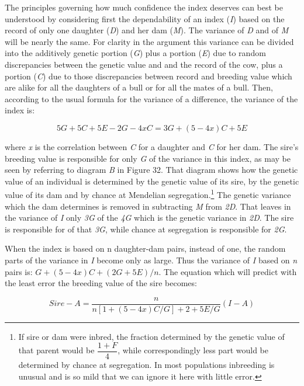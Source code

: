 The principles governing how much confidence the index deserves
can best be understood by considering first the dependability of an
index (\textit{I}) based on the record of only one daughter (\textit{D})
and her dam (\textit{M}). The variance of \textit{D} and of \textit{M}
will be nearly the same. For clarity in the argument this variance can
be divided into the additively genetic portion (\textit{G}) plus a portion
(\textit{E}) due to random discrepancies between the genetic value and and
the record of the cow, plus a portion (\textit{C}) due to those
discrepancies between record and breeding value which are alike for all
the daughters of a bull or for all the mates of a
\newpage
\noindent
bull. Then, according to the usual formula for the variance of a difference,
the variance of the index is:

\[ 5G + 5C + 5E - 2G - 4xC = 3G + (5 - 4x)C + 5E \]

\noindent
where \textit{x} is the correlation between \textit{C} for a daughter and
\textit{C} for her dam. The sire's breeding value is responsible for only
\textit{G} of the variance in this index, as may be seen by referring to
diagram \textit{B} in Figure 32. That diagram shows how the genetic value
of an individual is  determined by the genetic value of its
sire,  by the genetic value of its dam and 
by chance at Mendelian segregation.\footnote{If sire or dam were inbred,
the fraction determined by the genetic value of that parent would be
$\dfrac{1+F}{4}$, while correspondingly less part would be determined by
chance at segregation. In most populations inbreeding is unusual and is so
mild that we can ignore it here with little error.} The genetic variance
which the dam determines is removed in subtracting \textit{M} from
\textit{2D}. That leaves in the variance of \textit{I} only \textit{3G}
of the \textit{4G} which is the genetic variance in \textit{2D}. The sire
is responsible for  of that \textit{3G}, while chance at
segregation is responsible for \textit{2G}.

When the index is based on n daughter-dam pairs, instead of one,
the random parts of the variance in \textit{I} become only
 as large. Thus the variance of \textit{I}
based on \textit{n} pairs is: $G + (5 - 4x)C + (2G + 5E)/n$.
The equation which will predict with the least error the breeding value
of the sire becomes:

\[ Sire - A = \dfrac{n}{n[1 + (5 -4x)C/G] + 2 + 5E/G}(I - A) \]

